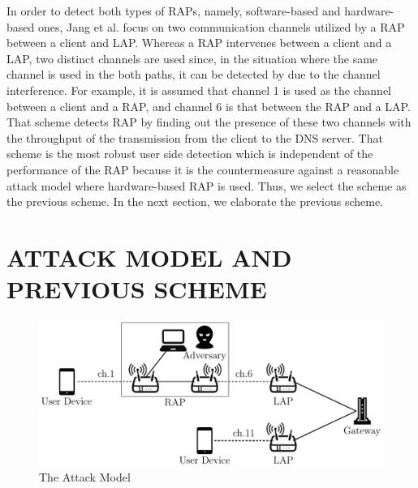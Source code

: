 \documentclass[conference]{IEEEtran}
\begin{document}
In order to detect both types of RAPs, namely, software-based and hardware-based ones, Jang et al. focus on two communication channels utilized by a RAP between a client and LAP\cite{previous}.
Whereas a RAP intervenes between a client and a LAP, two distinct channels are used since, in the situation where the same channel is used in the both paths, it can be detected by \cite{rtt} due to the channel interference.
For example, it is assumed that channel 1 is used as the channel between a client and a RAP, and channel 6 is that between the RAP and a LAP.
That scheme detects RAP by finding out the presence of these two channels with the throughput of the transmission from the client to the DNS server.
That scheme is the most robust user side detection which is independent of the performance of the RAP because it is the countermeasure against a reasonable attack model where hardware-based RAP is used.
Thus, we select the scheme \cite{previous} as the previous scheme.
In the next section, we elaborate the previous scheme.

\section{ATTACK MODEL AND PREVIOUS SCHEME}\label{sec:3}
\begin{figure}[t]
    \begin{center}
        \includegraphics[scale=0.5]{attack-model/attack-model.pdf}
        \caption{The Attack Model}
        \label{fig:model}
    \end{center}
\vspace{-2zh}
\end{figure}
\end{document}
